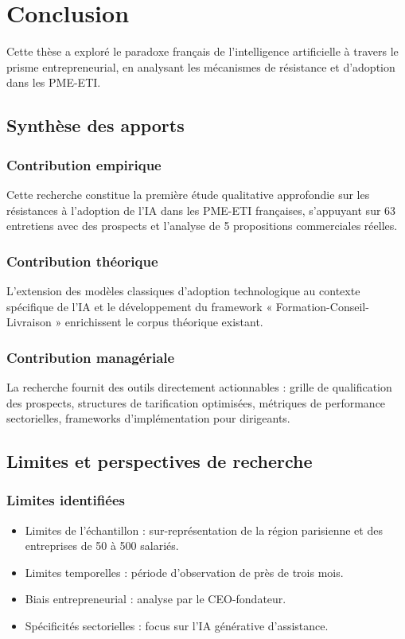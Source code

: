 \chapter{Conclusion}
\label{chap:conclusion}

Cette thèse a exploré le paradoxe français de l’intelligence artificielle à travers le prisme entrepreneurial, en analysant les mécanismes de résistance et d’adoption dans les PME-ETI.

\section{Synthèse des apports}

\subsection{Contribution empirique}
Cette recherche constitue la première étude qualitative approfondie sur les résistances à l’adoption de l’IA dans les PME-ETI françaises, s’appuyant sur 63 entretiens avec des prospects et l’analyse de 5 propositions commerciales réelles.

\subsection{Contribution théorique}
L’extension des modèles classiques d’adoption technologique au contexte spécifique de l’IA et le développement du framework « Formation-Conseil-Livraison » enrichissent le corpus théorique existant.

\subsection{Contribution managériale}
La recherche fournit des outils directement actionnables : grille de qualification des prospects, structures de tarification optimisées, métriques de performance sectorielles, frameworks d’implémentation pour dirigeants.

\section{Limites et perspectives de recherche}

\subsection{Limites identifiées}
\begin{itemize}
    \item Limites de l’échantillon : sur-représentation de la région parisienne et des entreprises de 50 à 500 salariés.
    \item Limites temporelles : période d’observation de près de trois mois.
    \item Biais entrepreneurial : analyse par le CEO-fondateur.
    \item Spécificités sectorielles : focus sur l’IA générative d’assistance.
\end{itemize}

